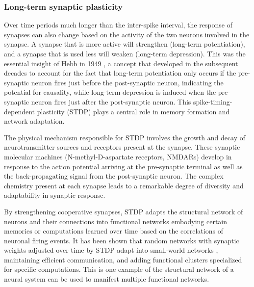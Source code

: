 \documentclass[twocolumn]{article}
\begin{document}
\subsubsection{Long-term synaptic plasticity}
Over time periods much longer than the inter-spike interval, the response of synapses can also change based on the activity of the two neurons involved in the synapse. A synapse that is more active will strengthen (long-term potentiation), and a synapse that is used less will weaken (long-term depression). This was the essential insight of Hebb in 1949 \cite{he1949}, a concept that developed in the subsequent decades \cite{bipo1998,somi2000} to account for the fact that long-term potentiation only occurs if the pre-synaptic neuron fires just before the post-synaptic neuron, indicating the potential for causality, while long-term depression is induced when the pre-synaptic neuron fires just after the post-synaptic neuron. This spike-timing-dependent plasticity (STDP) \cite{mage2012} plays a central role in memory formation and network adaptation. 

The physical mechanism responsible for STDP involves the growth and decay of neurotransmitter sources and receptors present at the synapse. These synaptic molecular machines (N-methyl-D-aspartate receptors, NMDARs) develop in response to the action potential arriving at the pre-synaptic terminal as well as the back-propagating signal from the post-synaptic neuron. The complex chemistry present at each synapse leads to a remarkable degree of diversity and adaptability in synaptic response.

By strengthening cooperative synapses, STDP adapts the structural network of neurons and their connections into functional networks embodying certain memories or computations learned over time based on the correlations of neuronal firing events. It has been shown that random networks with synaptic weights adjusted over time by STDP adapt into small-world networks \cite{shki2006}, maintaining efficient communication, and adding functional clusters specialized for specific computations. This is one example of the structural network of a neural system can be used to manifest multiple functional networks.
\end{document}
